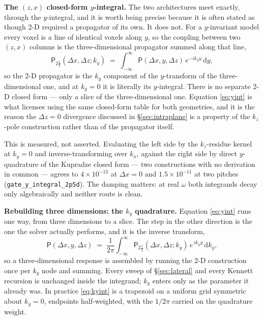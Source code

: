 \documentclass[11pt,a4paper]{article}
\begin{document}
\medskip\noindent
\textbf{The $(z,x)$ closed-form $y$-integral.} The two architectures meet exactly, through the
$y$-integral, and it is worth being precise because it is often stated as though 2\textonehalf-D
required a propagator of its own. It does not. For a $y$-invariant model every voxel is a line of
identical voxels along $y$, so the coupling between two $(z,x)$ columns is the three-dimensional
propagator summed along that line,
\begin{equation}
\mathsf{P}_{2\frac12}(\Delta x, \Delta z; k_y)
\;=\;
\int_{-\infty}^{\infty} \mathsf{P}(\Delta x, y, \Delta z)\, e^{-i k_y y}\, \mathrm{d}y ,
\label{eq:yint}
\end{equation}
so the 2\textonehalf-D propagator is the $k_y$ component of the $y$-transform of the
three-dimensional one, and at $k_y = 0$ it is literally its $y$-integral. There is no separate
2\textonehalf-D closed form --- only a slice of the three-dimensional one. Equation
\eqref{eq:yint} is what licenses using the same closed-form table for both geometries, and it is
the reason the $\Delta z = 0$ divergence discussed in \S\ref{sec:intraplane} is a property of the
$k_z$-pole construction rather than of the propagator itself.

This is measured, not asserted. Evaluating the left side by the $k_z$-residue kernel at $k_y=0$
and inverse-transforming over $k_x$, against the right side by direct $y$-quadrature of the
Kupradze closed form --- two constructions with no derivation in common --- agrees to
$4\times10^{-13}$ at $\Delta x = 0$ and $1.5\times10^{-11}$ at two pitches
(\texttt{gate\_y\_integral\_2p5d}). The damping matters: at real $\omega$ both integrands decay
only algebraically and neither route is clean.

\medskip\noindent
\textbf{Rebuilding three dimensions: the $k_y$ quadrature.} Equation \eqref{eq:yint} runs one
way, from three dimensions to a slice. The step in the other direction is the one the solver
actually performs, and it is the inverse transform,
\begin{equation}
\mathsf{P}(\Delta x, y, \Delta z)
\;=\;
\frac{1}{2\pi}\int_{-\infty}^{\infty}
\mathsf{P}_{2\frac12}(\Delta x, \Delta z; k_y)\, e^{\,i k_y y}\, \mathrm{d}k_y ,
\label{eq:kyint}
\end{equation}
so a three-dimensional response is assembled by running the 2\textonehalf-D construction once per
$k_y$ node and summing. Every sweep of \S\ref{sec:lateral} and every Kennett recursion is
unchanged inside the integrand; $k_y$ enters only as the parameter it already was. In practice
\eqref{eq:kyint} is a trapezoid on a uniform grid symmetric about $k_y=0$, endpoints
half-weighted, with the $1/2\pi$ carried on the quadrature weight.
\end{document}
